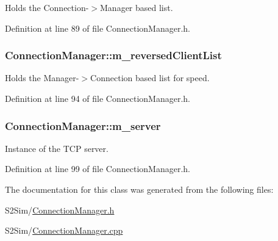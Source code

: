 Holds the Connection-\/$>$Manager based list. 



Definition at line 89 of file Connection\-Manager.\-h.

\hypertarget{class_connection_manager_aae27a14334d4b84076231534196e75eb}{
\subsubsection[{m\-\_\-reversed\-Client\-List}]{ Connection\-Manager\-::m\-\_\-reversed\-Client\-List\hspace{0.3cm}{\ttfamily [private]}}}\label{class_connection_manager_aae27a14334d4b84076231534196e75eb}


Holds the Manager-\/$>$Connection based list for speed. 



Definition at line 94 of file Connection\-Manager.\-h.

\hypertarget{class_connection_manager_a8858415ddb04364d4697f7ea00aa2977}{
\subsubsection[{m\-\_\-server}]{ Connection\-Manager\-::m\-\_\-server\hspace{0.3cm}{\ttfamily [private]}}}\label{class_connection_manager_a8858415ddb04364d4697f7ea00aa2977}


Instance of the T\-C\-P server. 



Definition at line 99 of file Connection\-Manager.\-h.



The documentation for this class was generated from the following files\-:\begin{DoxyCompactItemize}
\item 
S2\-Sim/\hyperlink{_connection_manager_8h}{Connection\-Manager.\-h}\item 
S2\-Sim/\hyperlink{_connection_manager_8cpp}{Connection\-Manager.\-cpp}\end{DoxyCompactItemize}
